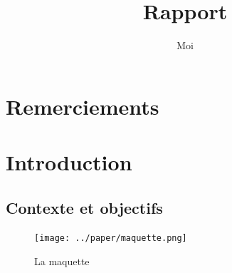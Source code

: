 \documentclass[oneside, a4paper, 11pt]{book}
\title{Rapport}
\author{Moi}
\begin{document}
\frontmatter
\maketitle

\chapter*{Remerciements}

\renewcommand{\contentsname}{Sommaire}
\tableofcontents

\mainmatter

\titleformat{\chapter}[display]
	{\normalfont\bfseries}{}{1em}{\Large\thechapter\hspace{1em}}

\chapter{Introduction}
\label{sec:intro}

\section{Contexte et objectifs}

\begin{figure}
	\begin{minipage}{0.28\textwidth}
		\centering
		\vspace{-0mm}
		\texttt{[image: ../paper/maquette.png]}
		\caption{La maquette}
		\label{fig:maquette}
	\end{minipage}
\end{figure}
\end{document}
